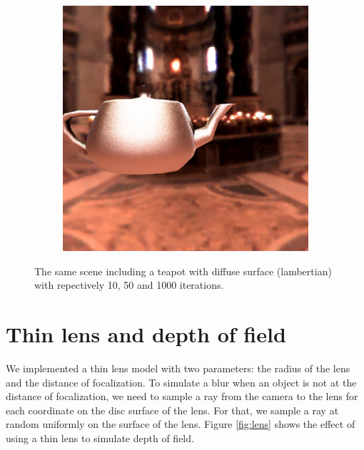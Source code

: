 \documentclass[acmsmall]{acmart}
\begin{document}
\begin{figure}[h]
\begin{subfigure}{.3\textwidth}
\end{subfigure} %
\begin{subfigure}{.3\textwidth}
  \centering
  \includegraphics[width=.9\linewidth]{img/1000.png}
\end{subfigure}    
    
    
    \caption{The same scene including a teapot with diffuse surface (lambertian) with repectively 10, 50 and 1000 iterations. }
    \label{fig:lambertian}
\end{figure}


\section{Thin lens and depth of field}
We implemented a thin lens model with two parameters: the radius of the lens and the distance of focalization.
To simulate a blur when an object is not at the distance of focalization, we need to sample a ray from the camera to the lens for each coordinate on the disc surface of the lens.
For that, we sample a ray at random uniformly on the surface of the lens.
Figure \ref{fig:lens} shows the effect of using a thin lens to simulate depth of field.
\end{document}
